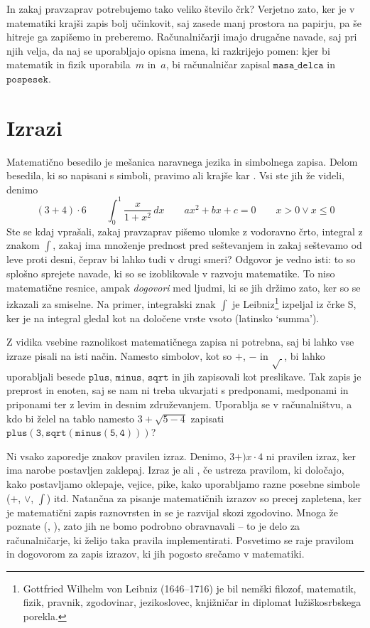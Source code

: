 In zakaj pravzaprav potrebujemo tako veliko število črk? Verjetno zato, ker je v
matematiki krajši zapis bolj učinkovit, saj zasede manj prostora na papirju, pa še hitreje
ga zapišemo in preberemo. Računalničarji imajo drugačne navade, saj pri njih velja, da naj
se uporabljajo opisna imena, ki razkrijejo pomen: kjer bi matematik in fizik uporabila~$m$
in~$a$, bi računalničar zapisal $\mathtt{masa\_delca}$ in $\mathtt{pospesek}$.

\section{Izrazi}
\label{sec:izrazi}

Matematično besedilo je mešanica naravnega jezika in simbolnega zapisa. Delom besedila, ki
so napisani s simboli, pravimo  ali krajše kar . Vsi
ste jih že videli, denimo
%
\begin{equation*}
  (3 + 4) \cdot 6 \qquad
  \int_0^1 \frac{x}{1 + x^2} \, dx \qquad
  a x^2 + b x + c = 0 \qquad
  x > 0 \lor x \leq 0
\end{equation*}
%
Ste se kdaj vprašali, zakaj pravzaprav pišemo ulomke z vodoravno črto, integral z znakom
$\int$, zakaj ima množenje prednost pred seštevanjem in zakaj seštevamo od leve proti
desni, čeprav bi lahko tudi v drugi smeri? Odgovor je vedno isti: to so splošno sprejete
navade, ki so se izoblikovale v razvoju matematike. To niso matematične resnice, ampak
\emph{dogovori} med ljudmi, ki se jih držimo zato, ker so se izkazali za smiselne. Na
primer, integralski znak $\int$ je Leibniz\footnote{Gottfried Wilhelm von Leibniz
  (1646--1716) je bil nemški filozof, matematik, fizik, pravnik, zgodovinar, jezikoslovec,
  knjižničar in diplomat lužiškosrbskega porekla.} izpeljal iz črke S, ker je na
integral gledal kot na določene vrste vsoto (latinsko `summa').

Z vidika vsebine raznolikost matematičnega zapisa ni potrebna, saj bi lahko vse izraze
pisali na isti način. Namesto simbolov, kot so $+$, $-$ in $\sqrt{\ }$, bi lahko
uporabljali besede $\mathtt{plus}$, $\mathtt{minus}$, $\mathtt{sqrt}$ in jih zapisovali
kot preslikave. Tak zapis je preprost in enoten, saj se nam ni treba ukvarjati s
predponami, medponami in priponami ter z levim in desnim združevanjem. Uporablja se v
računalništvu, a kdo bi želel na tablo namesto $3 + \sqrt{5 - 4}$ zapisati
$\mathtt{plus(3, \mathtt{sqrt}(\mathtt{minus}(5, 4)))}$?

Ni vsako zaporedje znakov pravilen izraz. Denimo, $3 + ) x \cdot 4$ ni pravilen izraz, ker ima narobe postavljen zaklepaj.
%
Izraz je  ali , če ustreza pravilom, ki določajo, kako postavljamo oklepaje, vejice, pike, kako uporabljamo razne posebne simbole ($+$, $\lor$, $\int$) itd.
%
Natančna  za pisanje matematičnih izrazov so precej zapletena, ker je matematični zapis raznovrsten
in se je razvijal skozi zgodovino. Mnoga že poznate (, ), zato jih ne bomo podrobno obravnavali -- to je delo za računalničarje, ki želijo taka pravila implementirati. Posvetimo se raje pravilom in dogovorom za zapis izrazov, ki jih pogosto srečamo v matematiki.

